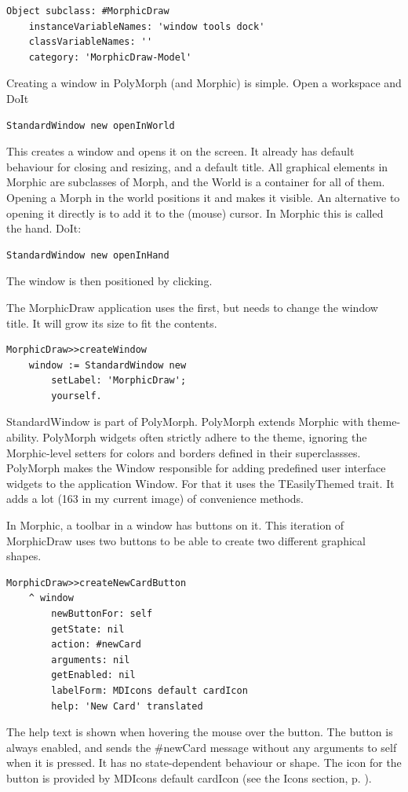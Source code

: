 \documentclass[10pt]{article}   	%
\begin{document}
\begin{verbatim}
Object subclass: #MorphicDraw
    instanceVariableNames: 'window tools dock'
    classVariableNames: ''
    category: 'MorphicDraw-Model'
\end{verbatim}

Creating a window in PolyMorph (and Morphic)  is simple. Open a workspace and DoIt
\begin{verbatim}
StandardWindow new openInWorld 
\end{verbatim} 
This creates a window and opens it on the screen. 
It already has default behaviour for closing and resizing, and a default title. 
All graphical elements in Morphic are subclasses of Morph, and the 
World is a container for all of them. Opening a Morph in the world
positions it and makes it visible. An alternative to opening it directly is
to add it to the (mouse) cursor. In Morphic this is called the hand.
DoIt:
\begin{verbatim}
StandardWindow new openInHand 
\end{verbatim} 
The window is then positioned by clicking.

The MorphicDraw application uses the first, but needs to change 
the window title. It will grow its size to fit the contents.

\begin{verbatim}
MorphicDraw>>createWindow
    window := StandardWindow new
        setLabel: 'MorphicDraw';
        yourself.
\end{verbatim}

StandardWindow is part of PolyMorph. PolyMorph extends Morphic
with theme-ability. PolyMorph widgets often strictly adhere to the theme,
ignoring the Morphic-level setters for colors and borders defined in
their superclassses.  PolyMorph makes the 
Window responsible for adding predefined user interface widgets
to the application Window. For that it uses the TEasilyThemed 
trait. It adds a lot (163 in my current image) of convenience methods.

In Morphic, a toolbar in a window has buttons on it. This iteration of
MorphicDraw uses two buttons to be able to create two different 
graphical shapes.

\begin{verbatim}
MorphicDraw>>createNewCardButton
    ^ window
        newButtonFor: self
        getState: nil
        action: #newCard
        arguments: nil
        getEnabled: nil
        labelForm: MDIcons default cardIcon
        help: 'New Card' translated
\end{verbatim}
The help text is shown when hovering the mouse over the button.
The button is always enabled, and sends the \#newCard message 
without any arguments to self when it is pressed. It has no 
state-dependent behaviour or shape. The icon for the button
is provided by MDIcons default cardIcon (see the Icons section,  p. \pageref{Icons}).
\end{document}
